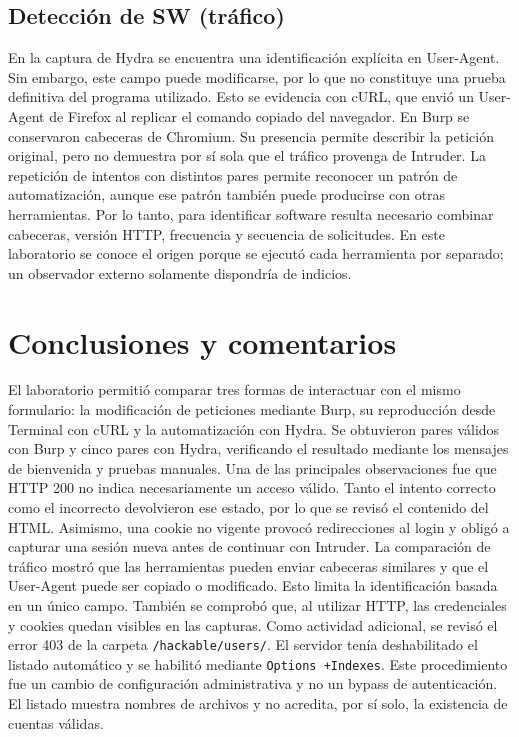 \documentclass[letterpaper,12pt]{article}
\begin{document}
\subsection{Detección de SW (tráfico)}
En la captura de Hydra se encuentra una identificación explícita en User-Agent. Sin embargo, este campo puede modificarse, por lo que no constituye una prueba definitiva del programa utilizado. Esto se evidencia con cURL, que envió un User-Agent de Firefox al replicar el comando copiado del navegador.
En Burp se conservaron cabeceras de Chromium. Su presencia permite describir la petición original, pero no demuestra por sí sola que el tráfico provenga de Intruder. La repetición de intentos con distintos pares permite reconocer un patrón de automatización, aunque ese patrón también puede producirse con otras herramientas.
Por lo tanto, para identificar software resulta necesario combinar cabeceras, versión HTTP, frecuencia y secuencia de solicitudes. En este laboratorio se conoce el origen porque se ejecutó cada herramienta por separado; un observador externo solamente dispondría de indicios.
\section*{Conclusiones y comentarios}
El laboratorio permitió comparar tres formas de interactuar con el mismo formulario: la modificación de peticiones mediante Burp, su reproducción desde Terminal con cURL y la automatización con Hydra. Se obtuvieron pares válidos con Burp y cinco pares con Hydra, verificando el resultado mediante los mensajes de bienvenida y pruebas manuales.
Una de las principales observaciones fue que HTTP 200 no indica necesariamente un acceso válido. Tanto el intento correcto como el incorrecto devolvieron ese estado, por lo que se revisó el contenido del HTML. Asimismo, una cookie no vigente provocó redirecciones al login y obligó a capturar una sesión nueva antes de continuar con Intruder.
La comparación de tráfico mostró que las herramientas pueden enviar cabeceras similares y que el User-Agent puede ser copiado o modificado. Esto limita la identificación basada en un único campo. También se comprobó que, al utilizar HTTP, las credenciales y cookies quedan visibles en las capturas.
Como actividad adicional, se revisó el error 403 de la carpeta \texttt{/hackable/users/}. El servidor tenía deshabilitado el listado automático y se habilitó mediante \texttt{Options +Indexes}. Este procedimiento fue un cambio de configuración administrativa y no un bypass de autenticación. El listado muestra nombres de archivos y no acredita, por sí solo, la existencia de cuentas válidas.
\end{document}
